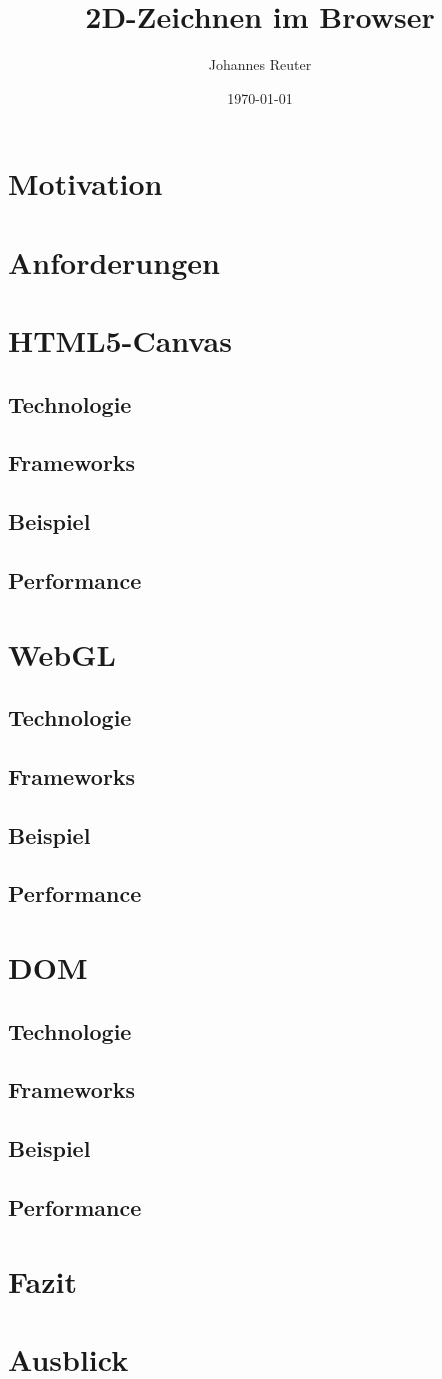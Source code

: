 \documentclass[a4paper,12pt]{article}
\title{2D-Zeichnen im Browser}
\author{Johannes Reuter}
\date{\today}
\begin{document}
\maketitle
\tableofcontents
\section{Motivation}
\section{Anforderungen}
\section{HTML5-Canvas}
\subsection{Technologie}
\subsection{Frameworks}
\subsection{Beispiel}
\subsection{Performance}
\section{WebGL}
\subsection{Technologie}
\subsection{Frameworks}
\subsection{Beispiel}
\subsection{Performance}
\section{DOM}
\subsection{Technologie}
\subsection{Frameworks}
\subsection{Beispiel}
\subsection{Performance}
\section{Fazit}
\section{Ausblick}
\end{document}
